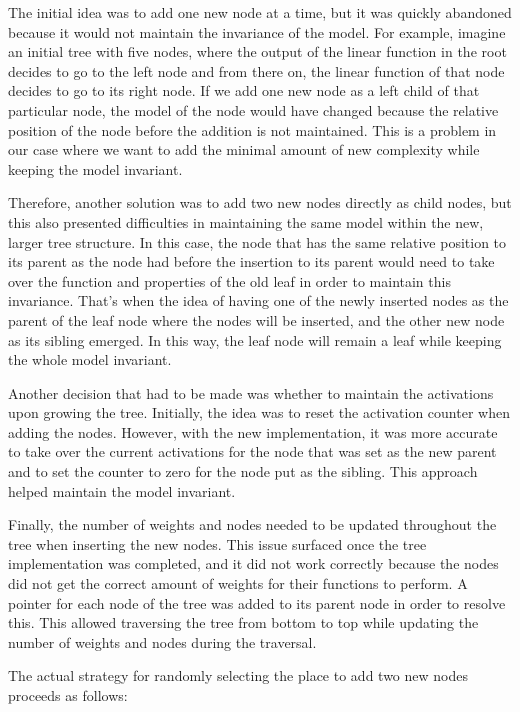 The initial idea was to add one new node at a time, but it was quickly abandoned because it would not maintain the invariance of the model. For example, imagine an initial tree with five nodes, where the output of the linear function in the root decides to go to the left node and from there on, the linear function of that node decides to go to its right node. If we add one new node as a left child of that particular node, the model of the node would have changed because the relative position of the node before the addition is not maintained. This is a problem in our case where we want to add the minimal amount of new complexity while keeping the model invariant.

Therefore, another solution was to add two new nodes directly as child nodes, but this also presented difficulties in maintaining the same model within the new, larger tree structure. In this case, the node that has the same relative position to its parent as the node had before the insertion to its parent would need to take over the function and properties of the old leaf in order to maintain this invariance. That's when the idea of having one of the newly inserted nodes as the parent of the leaf node where the nodes will be inserted, and the other new node as its sibling emerged. In this way, the leaf node will remain a leaf while keeping the whole model invariant.

Another decision that had to be made was whether to maintain the activations upon growing the tree. Initially, the idea was to reset the activation counter when adding the nodes. However, with the new implementation, it was more accurate to take over the current activations for the node that was set as the new parent and to set the counter to zero for the node put as the sibling. This approach helped maintain the model invariant.

Finally, the number of weights and nodes needed to be updated throughout the tree when inserting the new nodes. This issue surfaced once the tree implementation was completed, and it did not work correctly because the nodes did not get the correct amount of weights for their functions to perform. A pointer for each node of the tree was added to its parent node in order to resolve this. This allowed traversing the tree from bottom to top while updating the number of weights and nodes during the traversal.

The actual strategy for randomly selecting the place to add two new nodes proceeds as follows:

